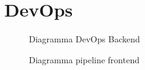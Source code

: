 \section{DevOps}
\label{sec:devops}


\begin{figure}[ht]
    \centering
    \caption{Diagramma DevOps Backend}
    \label{auth_sequence}
\end{figure}


\begin{figure}[ht]
    \centering
    \caption{Diagramma pipeline frontend}
    \label{auth_sequence}
\end{figure}